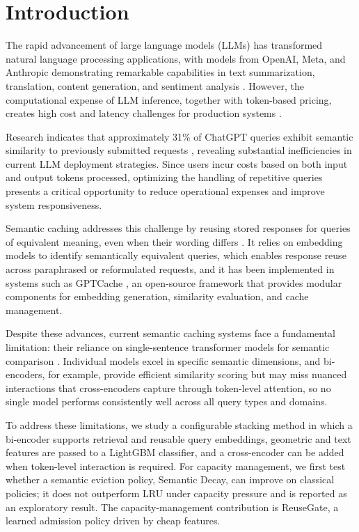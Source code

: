 \documentclass[authoryear,preprint,review,12pt]{elsarticle}
\begin{document}

\section{Introduction}
\label{sec:introduction}
The rapid advancement of large language models (LLMs) has transformed natural language processing applications, with models from OpenAI, Meta, and Anthropic demonstrating remarkable capabilities in text summarization, translation, content generation, and sentiment analysis \citep{brown2020language, jin2025reasoning, guo2026unleashing}. However, the computational expense of LLM inference, together with token-based pricing, creates high cost and latency challenges for production systems \citep{huang2024survey}.

Research indicates that approximately 31\% of ChatGPT queries exhibit semantic similarity to previously submitted requests \citep{gill2024meancache}, revealing substantial inefficiencies in current LLM deployment strategies. Since users incur costs based on both input and output tokens processed, optimizing the handling of repetitive queries presents a critical opportunity to reduce operational expenses and improve system responsiveness.

Semantic caching addresses this challenge by reusing stored responses for queries of equivalent meaning, even when their wording differs \citep{luo2025federated}. It relies on embedding models \citep{reimers2019sentence, deerwester1990indexing} to identify semantically equivalent queries, which enables response reuse across paraphrased or reformulated requests, and it has been implemented in systems such as GPTCache \citep{bang2023gptcache}, an open-source framework that provides modular components for embedding generation, similarity evaluation, and cache management.

Despite these advances, current semantic caching systems face a fundamental limitation: their reliance on single-sentence transformer models for semantic comparison \citep{li2025taming}. Individual models excel in specific semantic dimensions, and bi-encoders, for example, provide efficient similarity scoring but may miss nuanced interactions that cross-encoders capture through token-level attention, so no single model performs consistently well across all query types and domains.

To address these limitations, we study a configurable stacking method in which a bi-encoder supports retrieval and reusable query embeddings, geometric and text features are passed to a LightGBM classifier, and a cross-encoder can be added when token-level interaction is required. For capacity management, we first test whether a semantic eviction policy, Semantic Decay, can improve on classical policies; it does not outperform LRU under capacity pressure and is reported as an exploratory result. The capacity-management contribution is ReuseGate, a learned admission policy driven by cheap features.
\end{document}
